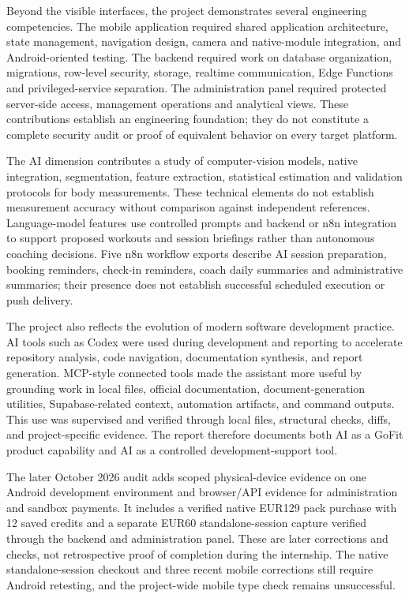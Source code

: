 \documentclass[12pt,a4paper,openany]{report}
\begin{document}
Beyond the visible interfaces, the project demonstrates several engineering competencies. The mobile application required shared application architecture, state management, navigation design, camera and native-module integration, and Android-oriented testing. The backend required work on database organization, migrations, row-level security, storage, realtime communication, Edge Functions and privileged-service separation. The administration panel required protected server-side access, management operations and analytical views. These contributions establish an engineering foundation; they do not constitute a complete security audit or proof of equivalent behavior on every target platform.


The AI dimension contributes a study of computer-vision models, native integration, segmentation, feature extraction, statistical estimation and validation protocols for body measurements. These technical elements do not establish measurement accuracy without comparison against independent references. Language-model features use controlled prompts and backend or n8n integration to support proposed workouts and session briefings rather than autonomous coaching decisions. Five n8n workflow exports describe AI session preparation, booking reminders, check-in reminders, coach daily summaries and administrative summaries; their presence does not establish successful scheduled execution or push delivery.


The project also reflects the evolution of modern software development practice. AI tools such as Codex were used during development and reporting to accelerate repository analysis, code navigation, documentation synthesis, and report generation. MCP-style connected tools made the assistant more useful by grounding work in local files, official documentation, document-generation utilities, Supabase-related context, automation artifacts, and command outputs. This use was supervised and verified through local files, structural checks, diffs, and project-specific evidence. The report therefore documents both AI as a GoFit product capability and AI as a controlled development-support tool.


The later October 2026 audit adds scoped physical-device evidence on one Android development environment and browser/API evidence for administration and sandbox payments. It includes a verified native EUR129 pack purchase with 12 saved credits and a separate EUR60 standalone-session capture verified through the backend and administration panel. These are later corrections and checks, not retrospective proof of completion during the internship. The native standalone-session checkout and three recent mobile corrections still require Android retesting, and the project-wide mobile type check remains unsuccessful.
\end{document}

